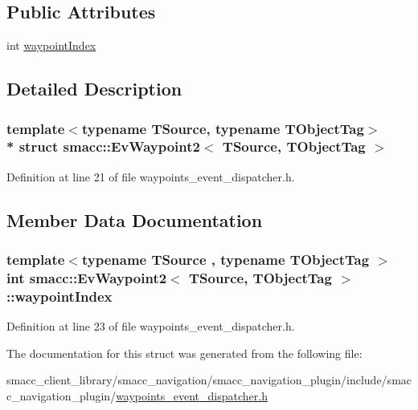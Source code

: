 \subsection*{Public Attributes}
\begin{DoxyCompactItemize}
\item 
int \hyperlink{structsmacc_1_1EvWaypoint2_a473569a39f1b9a0bc4424463e0a8fc55}{waypoint\+Index}
\end{DoxyCompactItemize}


\subsection{Detailed Description}
\subsubsection*{template$<$typename T\+Source, typename T\+Object\+Tag$>$\\*
struct smacc\+::\+Ev\+Waypoint2$<$ T\+Source, T\+Object\+Tag $>$}



Definition at line 21 of file waypoints\+\_\+event\+\_\+dispatcher.\+h.



\subsection{Member Data Documentation}
\subsubsection[{\texorpdfstring{waypoint\+Index}{waypointIndex}}]{\setlength{\rightskip}{0pt plus 5cm}template$<$typename T\+Source , typename T\+Object\+Tag $>$ int {\bf smacc\+::\+Ev\+Waypoint2}$<$ T\+Source, T\+Object\+Tag $>$\+::waypoint\+Index}\hypertarget{structsmacc_1_1EvWaypoint2_a473569a39f1b9a0bc4424463e0a8fc55}{}\label{structsmacc_1_1EvWaypoint2_a473569a39f1b9a0bc4424463e0a8fc55}


Definition at line 23 of file waypoints\+\_\+event\+\_\+dispatcher.\+h.



The documentation for this struct was generated from the following file\+:\begin{DoxyCompactItemize}
\item 
smacc\+\_\+client\+\_\+library/smacc\+\_\+navigation/smacc\+\_\+navigation\+\_\+plugin/include/smacc\+\_\+navigation\+\_\+plugin/\hyperlink{waypoints__event__dispatcher_8h}{waypoints\+\_\+event\+\_\+dispatcher.\+h}\end{DoxyCompactItemize}
